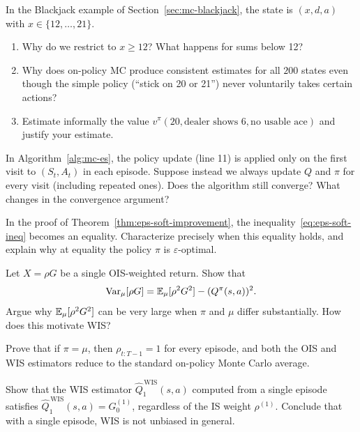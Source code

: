 \begin{exercise}
\label{ex:mc-blackjack}
In the Blackjack example of Section~\ref{sec:mc-blackjack}, the state is $(x, d, a)$ with $x \in \{12,\dots,21\}$.
\begin{enumerate}[label=(\alph*)]
  \item Why do we restrict to $x \ge 12$?  What happens for sums below 12?
  \item Why does on-policy MC produce consistent estimates for all $200$ states even though the simple policy (``stick on 20 or 21'') never voluntarily takes certain actions?
  \item Estimate informally the value $v^\pi(20, \text{dealer shows 6}, \text{no usable ace})$ and justify your estimate.
\end{enumerate}
\end{exercise}

\begin{exercise}
\label{ex:mc-exploring-starts}
In Algorithm~\ref{alg:mc-es}, the policy update (line 11) is applied only on the first visit to $(S_t, A_t)$ in each episode.  Suppose instead we always update $Q$ and $\pi$ for every visit (including repeated ones).  Does the algorithm still converge?  What changes in the convergence argument?
\end{exercise}

\begin{exercise}
\label{ex:mc-eps-soft-equality}
In the proof of Theorem~\ref{thm:eps-soft-improvement}, the inequality~\eqref{eq:eps-soft-ineq} becomes an equality.  Characterize precisely when this equality holds, and explain why at equality the policy $\pi$ is $\varepsilon$-optimal.
\end{exercise}

\begin{exercise}
\label{ex:mc-ois-variance}
Let $X = \rho G$ be a single OIS-weighted return.  Show that
\[
  \operatorname{Var}_\mu[\rho G] = \operatorname{\mathbb{E}}_\mu[\rho^2 G^2] - (Q^\pi(s,a))^2.
\]
Argue why $\operatorname{\mathbb{E}}_\mu[\rho^2 G^2]$ can be very large when $\pi$ and $\mu$ differ substantially.  How does this motivate WIS?
\end{exercise}

\begin{exercise}
\label{ex:mc-is-reduction}
Prove that if $\pi = \mu$, then $\rho_{t:T-1} = 1$ for every episode, and both the OIS and WIS estimators reduce to the standard on-policy Monte Carlo average.
\end{exercise}

\begin{exercise}
\label{ex:mc-wis-bias}
Show that the WIS estimator $\widehat{Q}_1^{\,\mathrm{WIS}}(s,a)$ computed from a single episode satisfies $\widehat{Q}_1^{\,\mathrm{WIS}}(s,a) = G_0^{(1)}$, regardless of the IS weight $\rho^{(1)}$.  Conclude that with a single episode, WIS is not unbiased in general.
\end{exercise}

